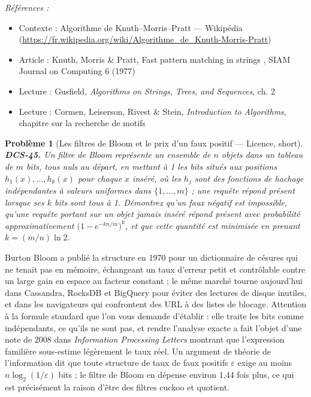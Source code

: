 \documentclass[11pt]{article}
\newtheorem{problem}{Problème}
\newenvironment{refs}{\par\small\noindent\emph{Références :}\begin{itemize}\setlength\itemsep{0pt}}{\end{itemize}\normalsize}
\begin{document}
\begin{refs}
\item Contexte : Algorithme de Knuth--Morris--Pratt --- Wikipédia (\url{https://fr.wikipedia.org/wiki/Algorithme_de_Knuth-Morris-Pratt})
\item Article : Knuth, Morris \& Pratt, \og{} Fast pattern matching in strings \fg{}, SIAM Journal on Computing 6 (1977)
\item Lecture : Gusfield, \textit{Algorithms on Strings, Trees, and Sequences}, ch. 2
\item Lecture : Cormen, Leiserson, Rivest \& Stein, \textit{Introduction to Algorithms}, chapitre sur la recherche de motifs
\end{refs}

\bigskip

\begin{problem}[{Les filtres de Bloom et le prix d'un faux positif --- Licence, short}]
\textbf{DCS-45.} Un filtre de Bloom représente un ensemble de $ n $ objets dans un tableau de $ m $ bits, tous nuls au départ, en mettant à 1 les bits situés aux positions $ h_1(x), \dots, h_k(x) $ pour chaque $ x $ inséré, où les $ h_j $ sont des fonctions de hachage indépendantes à valeurs uniformes dans $ \{1, \dots, m\} $ ; une requête répond \og{} présent \fg{} lorsque ses $ k $ bits sont tous à 1. Démontrez qu'un faux négatif est impossible, qu'une requête portant sur un objet jamais inséré répond \og{} présent \fg{} avec probabilité approximativement $ \big(1 - e^{-kn/m}\big)^{k} $, et que cette quantité est minimisée en prenant $ k = (m/n)\ln 2 $.
\end{problem}

\noindent Burton Bloom a publié la structure en 1970 pour un dictionnaire de césures qui ne tenait pas en mémoire, échangeant un taux d'erreur petit et contrôlable contre un large gain en espace au facteur constant ; le même marché tourne aujourd'hui dans Cassandra, RocksDB et BigQuery pour éviter des lectures de disque inutiles, et dans les navigateurs qui confrontent des URL à des listes de blocage. Attention à la formule standard que l'on vous demande d'établir : elle traite les bits comme indépendants, ce qu'ils ne sont pas, et rendre l'analyse exacte a fait l'objet d'une note de 2008 dans \textit{Information Processing Letters} montrant que l'expression familière sous-estime légèrement le taux réel. Un argument de théorie de l'information dit que toute structure de taux de faux positifs $\varepsilon$ exige au moins $ n \log_2(1/\varepsilon) $ bits ; le filtre de Bloom en dépense environ 1,44 fois plus, ce qui est précisément la raison d'être des filtres cuckoo et quotient.
\end{document}
